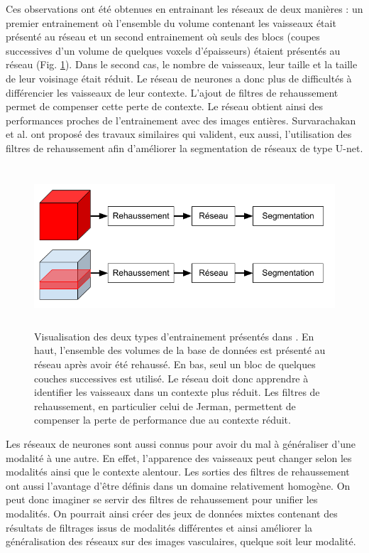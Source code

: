Ces observations ont été obtenues en entrainant les réseaux de deux manières : un premier entrainement où l'ensemble du volume contenant les vaisseaux était présenté au réseau et un second entrainement où seuls des blocs (coupes successives d'un volume de quelques voxels d'épaisseurs) étaient présentés au réseau (Fig. \ref{fig:full_vs_slab}). Dans le second cas, le nombre de vaisseaux, leur taille et la taille de leur voisinage était réduit. Le réseau de neurones a donc plus de difficultés à différencier les vaisseaux de leur contexte. L'ajout de filtres de rehaussement permet de compenser cette perte de contexte. Le réseau obtient ainsi des performances proches de l'entrainement avec des images entières. Survarachakan et al. \cite{Survarachakan2021_deep_vesselness} ont proposé des travaux similaires qui valident, eux aussi, l'utilisation des filtres de rehaussement afin d'améliorer la segmentation de réseaux de type U-net.
\begin{figure}[!ht]
    \centering
    \includegraphics[height=6cm]{Images/full_vs_slab.png}
    \caption{Visualisation des deux types d'entrainement présentés dans \cite{Affane_2022_article_commun}. En haut, l'ensemble des volumes de la base de données est présenté au réseau après avoir été rehaussé. En bas, seul un bloc de quelques couches successives est utilisé. Le réseau doit donc apprendre à identifier les vaisseaux dans un contexte plus réduit. Les filtres de rehaussement, en particulier celui de Jerman, permettent de compenser la perte de performance due au contexte réduit.}
    \label{fig:full_vs_slab}
  \end{figure}

Les réseaux de neurones sont aussi connus pour avoir du mal à généraliser d'une modalité à une autre. En effet, l'apparence des vaisseaux peut changer selon les modalités ainsi que le contexte alentour. Les sorties des filtres de rehaussement ont aussi l'avantage d'être définis dans un domaine relativement homogène. On peut donc imaginer se servir des filtres de rehaussement pour unifier les modalités. On pourrait ainsi créer des jeux de données mixtes contenant des résultats de filtrages issus de modalités différentes et ainsi améliorer la généralisation des réseaux sur des images vasculaires, quelque soit leur modalité.

